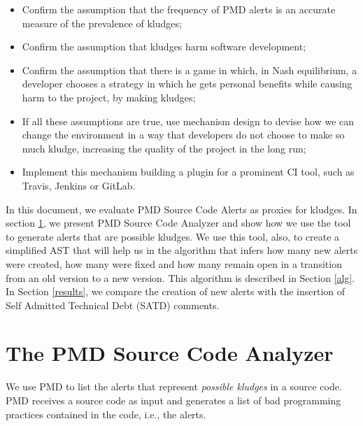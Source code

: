 \documentclass[
]{article}
\begin{document}
\begin{itemize}
\item
  Confirm the assumption that the frequency of PMD alerts is an accurate
  measure of the prevalence of kludges;
  
\item
  Confirm the assumption that kludges harm software development;

\item
  Confirm the assumption that there is a game in which, in Nash
  equilibrium, a developer chooses a strategy in which he gets personal
  benefits while causing harm to the project, by making kludges;

\item
  If all these assumptions are true, use mechanism design to devise how
  we can change the environment in a way that developers do not choose
  to make so much kludge, increasing the quality of the project in the
  long run;

\item
  Implement this mechanism building a plugin for a prominent CI tool,
  such as Travis, Jenkins or GitLab.
\end{itemize}

In this document, we evaluate PMD Source Code Alerts as proxies for
kludges. In section \ref{pmd}, we present PMD Source Code Analyzer and
show how we use the tool to generate alerts that are possible kludges.
We use this tool, also, to create a simplified AST that will help us in
the algorithm that infers how many new alerts were created, how many
were fixed and how many remain open in a transition from an old version
to a new version. This algorithm is described in Section \ref{alg}. In
Section \ref{results}, we compare the creation of new alerts with the
insertion of Self Admitted Technical Debt (SATD) comments.


\section{The PMD Source Code Analyzer}\label{pmd}

We use PMD to list the alerts that represent \textit{possible kludges}
in a source code. PMD receives a source code as input and generates a
list of bad programming practices contained in the code, i.e., the
alerts.
\end{document}

